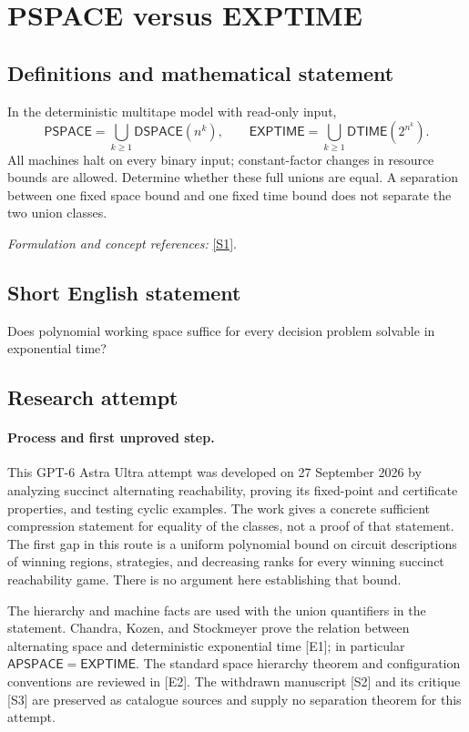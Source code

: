 \documentclass[11pt]{article}
\begin{document}
\section*{\texorpdfstring{PSPACE versus EXPTIME}{PSPACE versus EXPTIME}}\label{30006721}
\subsection{Definitions and mathematical statement}
In the deterministic multitape model with read-only input,
\[
 \mathsf{PSPACE}=\bigcup_{k\ge1}\mathsf{DSPACE}(n^k),\qquad
 \mathsf{EXPTIME}=\bigcup_{k\ge1}\mathsf{DTIME}(2^{n^k}).
\]
All machines halt on every binary input; constant-factor changes in resource bounds are allowed. Determine whether these full unions are equal. A separation between one fixed space bound and one fixed time bound does not separate the two union classes.
\par\smallskip\textit{Formulation and concept references:} \href{https://art.torvergata.it/bitstream/2108/32769/60437/ComputabilityDecidabilityComplexity.pdf}{[S1]}.

\subsection{Short English statement}
Does polynomial working space suffice for every decision problem solvable in exponential time?
\subsection{Research attempt}
\paragraph{Process and first unproved step.}
This GPT-6 Astra Ultra attempt was developed on 27 September 2026 by analyzing succinct alternating reachability, proving its fixed-point and certificate properties, and testing cyclic examples. The work gives a concrete sufficient compression statement for equality of the classes, not a proof of that statement. The first gap in this route is a uniform polynomial bound on circuit descriptions of winning regions, strategies, and decreasing ranks for every winning succinct reachability game. There is no argument here establishing that bound.

The hierarchy and machine facts are used with the union quantifiers in the statement. Chandra, Kozen, and Stockmeyer prove the relation between alternating space and deterministic exponential time [E1]; in particular $\mathsf{APSPACE}=\mathsf{EXPTIME}$. The standard space hierarchy theorem and configuration conventions are reviewed in [E2]. The withdrawn manuscript [S2] and its critique [S3] are preserved as catalogue sources and supply no separation theorem for this attempt.
\end{document}
